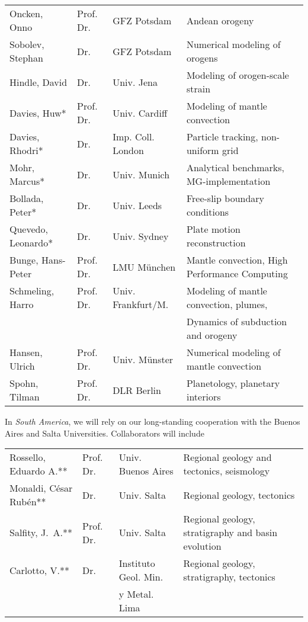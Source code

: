\documentclass[twoside,10pt]{article}
\begin{document}
\vspace{0.5ex}
\noindent
\begin{tabular*}{\textwidth}{l@{\extracolsep\fill}lll}
Oncken, Onno	& Prof. Dr.	& GFZ Potsdam 	& Andean orogeny \\
Sobolev, Stephan& Dr.		& GFZ Potsdam 	& Numerical modeling of orogens\\
Hindle, David	& Dr.		& Univ. Jena & Modeling of orogen-scale strain\\
Davies, Huw*& Prof. Dr.	& Univ. Cardiff & Modeling of mantle convection\\
Davies, Rhodri*& Dr.	& Imp. Coll. London & Particle tracking, non-uniform grid\\
Mohr, Marcus*& Dr.	& Univ. Munich & Analytical benchmarks, MG-implementation \\
Bollada, Peter*& Dr.	& Univ. Leeds & Free-slip boundary conditions\\
Quevedo, Leonardo*& Dr.	& Univ. Sydney & Plate motion reconstruction\\
Bunge, Hans-Peter& Prof. Dr.	& LMU M\"unchen & Mantle convection, High Performance Computing\\
Schmeling, Harro& Prof. Dr.	& Univ. Frankfurt/M. & Modeling of mantle convection, plumes,\\
   &&& Dynamics of subduction and orogeny\\
Hansen, Ulrich& Prof. Dr.	& Univ. M\"unster & Numerical modeling of mantle convection\\
Spohn, Tilman& Prof. Dr.	& DLR Berlin & Planetology, planetary interiors\\
\end{tabular*}

\noindent
In \emph{South America}, we will rely on our long-standing cooperation 
with the Buenos Aires and Salta Universities. Collaborators will include

\vspace{0.5ex}
\noindent
\begin{tabular*}{\textwidth}{l@{\extracolsep\fill}lll}
Rossello, Eduardo A.** & Prof. Dr.	& Univ. Buenos Aires & Regional geology and tectonics, seismology\\
Monaldi, C\'esar Rub\'en** & Dr.		& Univ. Salta & Regional geology, tectonics \\
Salfity, J.~A.**		& Prof. Dr.	& Univ. Salta & Regional geology, stratigraphy and basin evolution\\
Carlotto, V.**		& Dr.		& Instituto Geol. Min.	& Regional geology, stratigraphy, tectonics \\
   &&y Metal. Lima &\\
\end{tabular*}
\end{document}

